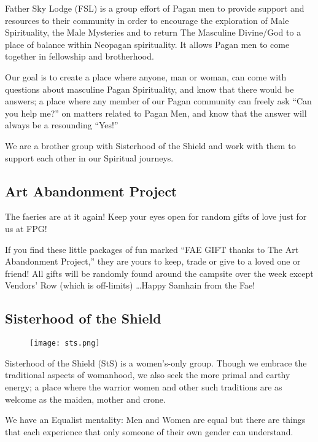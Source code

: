 \documentclass[9pt,twoside,openright,final,article,letterpaper]{memoir}
\let\oldsubsection=\subsection
\renewcommand{\subsection}[1]{%
  \vspace{6pt}
  \needspace{1.25in}
  \oldsubsection{#1}
  \nopagebreak}
\begin{document}
\begin{multicols}{3}
  Father Sky Lodge (FSL) is a group effort of Pagan men to provide
  support and resources to their community in order to encourage the
  exploration of Male Spirituality, the Male Mysteries and to return The
  Masculine Divine/God to a place of balance within Neopagan
  spirituality. It allows Pagan men to come together in fellowship and
  brotherhood.

  Our goal is to create a place where anyone, man or woman, can come
  with questions about masculine Pagan Spirituality, and know that
  there would be answers; a place where any member of our Pagan
  community can freely ask ``Can you help me?'' on matters related to
  Pagan Men, and know that the answer will always be a resounding
  ``Yes!''

  We are a brother group with Sisterhood of the Shield and work with
  them to support each other in our Spiritual journeys.

  \endgroup

  \subsection{Art Abandonment Project}

  The faeries are at it again! Keep your eyes open for random gifts of
  love just for us at FPG!

  If you find these little packages of fun marked ``FAE GIFT thanks to
  The Art Abandonment Project,'' they are yours to keep, trade or give
  to a loved one or friend!  All gifts will be randomly found around
  the campsite over the week except Vendors' Row (which is off-limits)
  \ldots Happy Samhain from the Fae!

  \subsection{Sisterhood of the Shield}

  \begingroup
  \setlength{\columnsep}{6pt}%
  \begin{wrapfigure}{l}{.5\columnwidth}
    \texttt{[image: sts.png]}
  \end{wrapfigure}

  Sisterhood of the Shield (StS) is a women’s-only group. Though we
  embrace the traditional aspects of womanhood, we also seek the more
  primal and earthy energy; a place where the warrior women and other
  such traditions are as welcome as the maiden, mother and crone.

  We have an Equalist mentality: Men and Women are equal but there are
  things that each experience that only someone of their own gender can
  understand.


\end{multicols}
\end{document}
